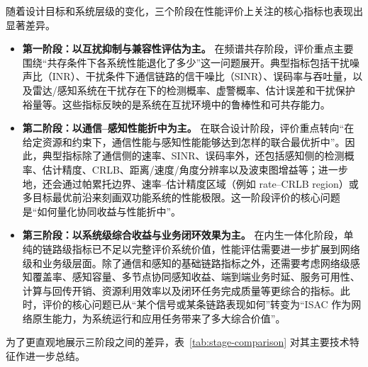 随着设计目标和系统层级的变化，三个阶段在性能评价上关注的核心指标也表现出显著差异。
\begin{itemize}
    \item \textbf{第一阶段：以互扰抑制与兼容性评估为主。}  
    在频谱共存阶段，评价重点主要围绕“共存条件下各系统性能退化了多少”这一问题展开。典型指标包括干扰噪声比（INR）、干扰条件下通信链路的信干噪比（SINR）、误码率与吞吐量，以及雷达/感知系统在干扰存在下的检测概率、虚警概率、估计误差和干扰保护裕量等\cite{Chiriyath2017RadarCommCoexistence,Blunt2018RadarSpectrumSharing}。这些指标反映的是系统在互扰环境中的鲁棒性和可共存能力。
    \item \textbf{第二阶段：以通信--感知性能折中为主。}  
    在联合设计阶段，评价重点转向“在给定资源和约束下，通信性能与感知性能能够达到怎样的联合最优折中”\cite{Liu2020JointRadarComm,Liu2022ISAC}。因此，典型指标除了通信侧的速率、SINR、误码率外，还包括感知侧的检测概率、估计精度、CRLB、距离/速度/角度分辨率以及波束图增益等；进一步地，还会通过帕累托边界、速率--估计精度区域（例如 rate--CRLB region）或多目标最优前沿来刻画双功能系统的性能极限\cite{Zhang2021ISAC6G}。这一阶段评价的核心问题是“如何量化协同收益与性能折中”。
    \item \textbf{第三阶段：以系统级综合收益与业务闭环效果为主。}  
    在内生一体化阶段，单纯的链路级指标已不足以完整评价系统价值，性能评估需要进一步扩展到网络级和业务级层面\cite{Zhang2020perceptive,Cui2024integrated}。除了通信和感知的基础链路指标之外，还需要考虑网络级感知覆盖率、感知容量、多节点协同感知收益、端到端业务时延、服务可用性、计算与回传开销、资源利用效率以及闭环任务完成质量等更综合的指标。此时，评价的核心问题已从“某个信号或某条链路表现如何”转变为“ISAC 作为网络原生能力，为系统运行和应用任务带来了多大综合价值”。
\end{itemize}
为了更直观地展示三阶段之间的差异，表~\ref{tab:stage-comparison} 对其主要技术特征作进一步总结。

